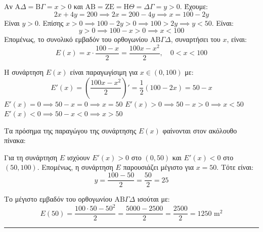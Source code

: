 \begin{alist}
\item Αν $\mathrm{A}\Delta = \mathrm{B}\Gamma = x > 0$ και $\mathrm{AB} = \mathrm{ZE} = \mathrm{H}\Theta = \Delta\Gamma = y > 0$. Έχουμε:
\[ 2x + 4y = 200 \implies 2x = 200 - 4y \implies x = 100 - 2y \]
Είναι $y > 0$. Επίσης $x > 0 \implies 100 - 2y > 0 \implies 100 > 2y \implies y < 50$.
Είναι:
\[ y > 0 \implies 100 - x > 0 \implies x < 100 \]
Επομένως, το συνολικό εμβαδόν του ορθογωνίου $\mathrm{AB}\Gamma\Delta$, συναρτήσει του $x$, είναι:
\[ E(x) = x \cdot \frac{100-x}{2} = \frac{100x - x^2}{2}, \quad 0 < x < 100 \]
\item Η συνάρτηση $E(x)$ είναι παραγωγίσιμη για $x \in (0, 100)$ με:
\[ E'(x) = \left(\frac{100x - x^2}{2}\right)' = \frac{1}{2} (100 - 2x) = 50 - x \]
$E'(x) = 0 \implies 50 - x = 0 \implies x = 50$
$E'(x) > 0 \implies 50 - x > 0 \implies x < 50$
$E'(x) < 0 \implies 50 - x < 0 \implies x > 50$

Τα πρόσημα της παραγώγου της συνάρτησης $E(x)$ φαίνονται στον ακόλουθο πίνακα:
\begin{center}
\end{center}
Για τη συνάρτηση $E$ ισχύουν $E'(x) > 0$ στο $(0,50)$ και $E'(x) < 0$ στο $(50,100)$. Επομένως, η συνάρτηση $E$ παρουσιάζει μέγιστο για $x=50$. Τότε είναι:
\[ y = \frac{100-50}{2} = \frac{50}{2} = 25 \]
\item Το μέγιστο εμβαδόν του ορθογωνίου $\mathrm{AB}\Gamma\Delta$ ισούται με:
\[ E(50) = \frac{100 \cdot 50 - 50^2}{2} = \frac{5000 - 2500}{2} = \frac{2500}{2} = 1250 \text{ m}^2 \]
\end{alist}
\vspace{6mm}
\noindent\rule{\textwidth}{0.4pt}
\vspace{6mm}

